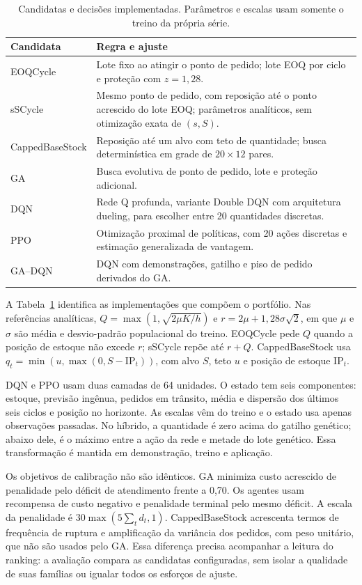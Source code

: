 \begin{table}[htbp]\centering\small
\caption{Candidatas e decisões implementadas. Parâmetros e escalas usam somente o treino da própria série.}
\label{tab:implemented_policies}
\begin{tabular}{@{}p{3.2cm}p{7.6cm}@{}}\toprule
Candidata & Regra e ajuste\\\midrule
EOQCycle & Lote fixo ao atingir o ponto de pedido; lote EOQ por ciclo e proteção com $z=1{,}28$.\\
sSCycle & Mesmo ponto de pedido, com reposição até o ponto acrescido do lote EOQ; parâmetros analíticos, sem otimização exata de $(s,S)$.\\
CappedBaseStock & Reposição até um alvo com teto de quantidade; busca determinística em grade de $20\times12$ pares.\\
GA & Busca evolutiva de ponto de pedido, lote e proteção adicional.\\
DQN & Rede Q profunda, variante Double DQN com arquitetura dueling, para escolher entre 20 quantidades discretas.\\
PPO & Otimização proximal de políticas, com 20 ações discretas e estimação generalizada de vantagem.\\
GA--DQN & DQN com demonstrações, gatilho e piso de pedido derivados do GA.\\
\bottomrule\end{tabular}
\end{table}
\FloatBarrier

A Tabela~\ref{tab:implemented_policies} identifica as implementações que compõem o portfólio. Nas referências analíticas, $Q=\max(1,\sqrt{2\mu K/h})$ e $r=2\mu+1{,}28\sigma\sqrt{2}$, em que $\mu$ e $\sigma$ são média e desvio-padrão populacional do treino. EOQCycle pede $Q$ quando a posição de estoque não excede $r$; sSCycle repõe até $r+Q$. CappedBaseStock usa $q_t=\min(u,\max(0,S-\mathrm{IP}_t))$, com alvo $S$, teto $u$ e posição de estoque $\mathrm{IP}_t$.

DQN e PPO usam duas camadas de 64 unidades. O estado tem seis componentes: estoque, previsão ingênua, pedidos em trânsito, média e dispersão dos últimos seis ciclos e posição no horizonte. As escalas vêm do treino e o estado usa apenas observações passadas. No híbrido, a quantidade é zero acima do gatilho genético; abaixo dele, é o máximo entre a ação da rede e metade do lote genético. Essa transformação é mantida em demonstração, treino e aplicação.

Os objetivos de calibração não são idênticos. GA minimiza custo acrescido de penalidade pelo déficit de atendimento frente a 0,70. Os agentes usam recompensa de custo negativo e penalidade terminal pelo mesmo déficit. A escala da penalidade é $30\max(5\sum_t d_t,1)$. CappedBaseStock acrescenta termos de frequência de ruptura e amplificação da variância dos pedidos, com peso unitário, que não são usados pelo GA. Essa diferença precisa acompanhar a leitura do ranking: a avaliação compara as candidatas configuradas, sem isolar a qualidade de suas famílias ou igualar todos os esforços de ajuste.

